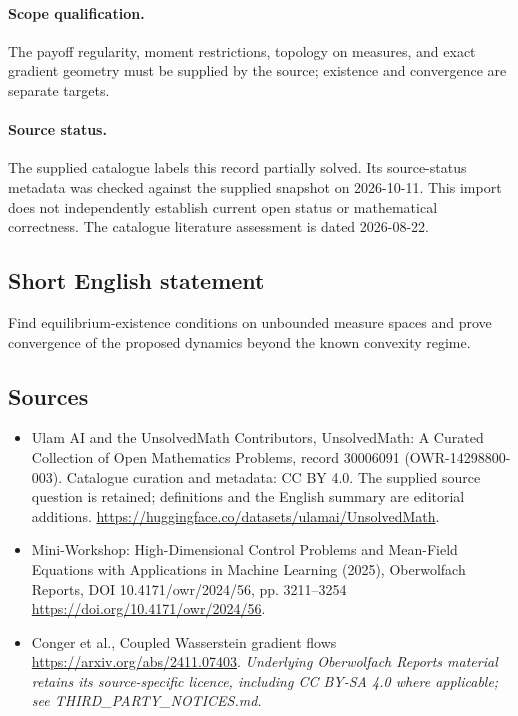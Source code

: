 \documentclass[11pt]{article}
\begin{document}
\paragraph{Scope qualification.}
The payoff regularity, moment restrictions, topology on measures, and exact gradient geometry must be supplied by the source; existence and convergence are separate targets.
\paragraph{Source status.}
The supplied catalogue labels this record partially solved. Its source-status metadata was checked against the supplied snapshot on 2026-10-11. This import does not independently establish current open status or mathematical correctness. The catalogue literature assessment is dated 2026-08-22.
\subsection{Short English statement}
Find equilibrium-existence conditions on unbounded measure spaces and prove convergence of the proposed dynamics beyond the known convexity regime.
\subsection{Sources}
\begin{itemize}
\item[S1] Ulam AI and the UnsolvedMath Contributors, UnsolvedMath: A Curated Collection of Open Mathematics Problems, record 30006091 (OWR-14298800-003). Catalogue curation and metadata: CC BY 4.0. The supplied source question is retained; definitions and the English summary are editorial additions.
\url{https://huggingface.co/datasets/ulamai/UnsolvedMath}.
\item[S2] Mini-Workshop: High-Dimensional Control Problems and Mean-Field Equations with Applications in Machine Learning (2025), Oberwolfach Reports, DOI 10.4171/owr/2024/56, pp. 3211--3254
\url{https://doi.org/10.4171/owr/2024/56}.
\item[S3] Conger et al., Coupled Wasserstein gradient flows
\url{https://arxiv.org/abs/2411.07403}.
\textit{Underlying Oberwolfach Reports material retains its source-specific licence, including CC BY-SA 4.0 where applicable; see THIRD\_PARTY\_NOTICES.md.}
\end{itemize}
\end{document}
